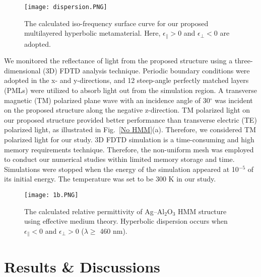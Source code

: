 \documentclass[conference]{IEEEtran}
\begin{document}
\begin{figure}[ht]
\centering
\texttt{[image: dispersion.PNG]}
\caption{The calculated iso-frequency surface curve for our proposed multilayered hyperbolic metamaterial. Here, $\epsilon_{\parallel} > 0$ and $\epsilon_{\perp} < 0$ are adopted.}
\label{dispersion}
\end{figure}

We monitored the reflectance of light from the proposed structure using a three-dimensional (3D) FDTD analysis technique. Periodic boundary conditions were adopted in the x- and y-directions, and 12 steep-angle perfectly matched layers (PMLs) were utilized to absorb light out from the simulation region. A transverse magnetic (TM) polarized plane wave with an incidence angle of 30$^{\circ}$ was incident on the proposed structure along the negative z-direction. TM polarized light on our proposed structure provided better performance than transverse electric (TE) polarized light, as illustrated in Fig.~\ref{No HMM}(a). Therefore, we considered TM polarized light for our study. 3D FDTD simulation is a time-consuming and high memory requirements technique. Therefore, the non-uniform mesh was employed to conduct our numerical studies within limited memory storage and time. Simulations were stopped when the energy of the simulation appeared at 10$^{-5}$ of its initial energy. The temperature was set to be 300 K in our study. 
   
\begin{figure}[ht]
\centering
\texttt{[image: 1b.PNG]}
\caption{The calculated relative permittivity of Ag--Al$_2$O$_3$ HMM structure using effective medium theory. Hyperbolic dispersion occurs when $\epsilon_{\parallel}<0$ and $\epsilon_{\bot}>0$ ($\lambda \geq$ 460 nm).}
\label{fig:2}
\end{figure}
\section{Results \& Discussions}
\end{document}
